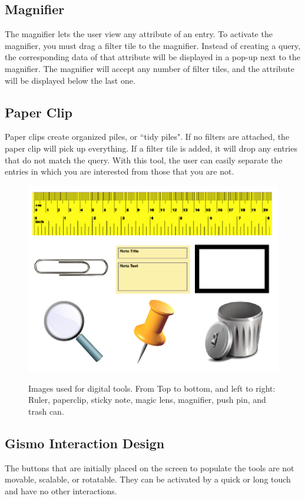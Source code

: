 \documentclass{article}
\begin{document}
\subsection*{Magnifier}
The magnifier lets the user view any attribute of an entry.  To activate the magnifier, you must drag a filter tile to the magnifier.  Instead of creating a query, the corresponding data of that attribute will be displayed in a pop-up next to the magnifier.  The magnifier will accept any number of filter tiles, and the attribute will be displayed below the last one.  
\subsection*{Paper Clip}
Paper clips create organized piles, or ``tidy piles".  If no filters are attached, the paper clip will pick up everything.  If a filter tile is added, it will drop any entries that do not match the query.   With this tool, the user can easily separate the entries in which you are interested from those that you are not.

\begin{figure}[t]
\centering
\scalebox{.623}
{\includegraphics{ToolsFigure.png}}
\caption{Images used for digital tools.  From Top to bottom, and left to right: Ruler, paperclip, sticky note, magic lens, magnifier, push pin, and trash can.}  
\end{figure} 


\subsection{Gismo Interaction Design}
The buttons that are initially placed on the screen to populate the tools are not movable, scalable, or rotatable.  They can be activated by a quick or long touch and have no other interactions.  
\end{document}
